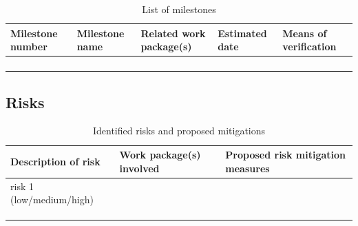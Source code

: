 \documentclass[11pt]{report}
\begin{document}
\begin{table}[!htbp]
\caption{List of milestones}
\centering
\begin{tabular}{@{}lllll@{}}
\toprule
\textbf{Milestone number} & \textbf{Milestone name} & \textbf{Related work package(s)} & \textbf{Estimated date} & \textbf{Means of verification} \\ \midrule
                          &                         &                                  &                         &                                \\
                          &                         &                                  &                         &                                \\
                          &                         &                                  &                         &                                \\
                          &                         &                                  &                         &                                \\ \bottomrule
\end{tabular}
\end{table}


\subsection{Risks}\label{risks}

\begin{table}[!htbp]
\caption{Identified risks and proposed mitigations}
\centering
\begin{tabular}{@{}lll@{}}
\toprule
\textbf{Description of risk} & \textbf{Work package(s) involved} & \textbf{Proposed risk mitigation measures} \\ \midrule
risk 1 (low/medium/high)     &                                   &                                            \\
                             &                                   &                                            \\
                             &                                   &                                            \\
                             &                                   &                                            \\ \bottomrule
\end{tabular}
\end{table}
\end{document}
